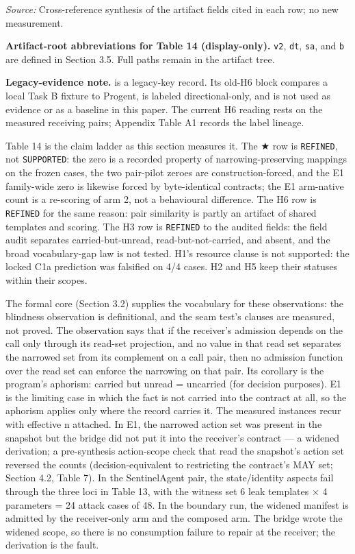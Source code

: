 \documentclass[
  10pt,
]{article}
\let\origtexttt\texttt
\renewcommand{\texttt}[1]{{\upshape\origtexttt{#1}}}
\renewcommand{\_}{\allowbreak\origunderscore}
\begin{document}
\emph{Source:} Cross-reference synthesis of the artifact fields cited in
each row; no new measurement.

\textbf{Artifact-root abbreviations for Table 14 (display-only).}
\texttt{v2}, \texttt{dt}, \texttt{sa}, and \texttt{b} are defined in
Section 3.5. Full paths remain in the artifact tree.

\textbf{Legacy-evidence note.}
 is a legacy-key record. Its
old-H6 block compares a local Task B fixture to Progent, is labeled
directional-only, and is not used as evidence or as a baseline in this
paper. The current H6 reading rests on the measured receiving pairs;
Appendix Table A1 records the label lineage.

Table 14 is the claim ladder as this section measures it. The ★ row is
\texttt{REFINED}, not \texttt{SUPPORTED}: the zero is a recorded
property of narrowing-preserving mappings on the frozen cases, the two
pair-pilot zeroes are construction-forced, and the E1 family-wide zero
is likewise forced by byte-identical contracts; the E1 arm-native count
is a re-scoring of arm 2, not a behavioural difference. The H6 row is
\texttt{REFINED} for the same reason: pair similarity is partly an
artifact of shared templates and scoring. The H3 row is \texttt{REFINED}
to the audited fields: the field audit separates carried-but-unread,
read-but-not-carried, and absent, and the broad vocabulary-gap law is
not tested. H1's resource clause is not supported: the locked C1a
prediction was falsified on 4/4 cases. H2 and H5 keep their statuses
within their scopes.

The formal core (Section 3.2) supplies the vocabulary for these
observations: the blindness observation is definitional, and the seam
test's clauses are measured, not proved. The observation says that if
the receiver's admission depends on the call only through its read-set
projection, and no value in that read set separates the narrowed set
from its complement on a call pair, then no admission function over the
read set can enforce the narrowing on that pair. Its corollary is the
program's aphorism: carried but unread = uncarried (for decision
purposes). E1 is the limiting case in which the fact is not carried into
the contract at all, so the aphorism applies only where the record
carries it. The measured instances recur with effective n attached. In
E1, the narrowed action set was present in the snapshot but the bridge
did not put it into the receiver's contract --- a widened derivation; a
pre-synthesis action-scope check that read the snapshot's action set
reversed the counts (decision-equivalent to restricting the contract's
MAY set; Section 4.2, Table 7). In the SentinelAgent pair, the
state/identity aspects fail through the three loci in Table 13, with the
witness set 6 leak templates × 4 parameters = 24 attack cases of 48. In
the boundary run, the widened manifest is admitted by the receiver-only
arm and the composed arm. The bridge wrote the widened scope, so there
is no consumption failure to repair at the receiver; the derivation is
the fault.
\end{document}

